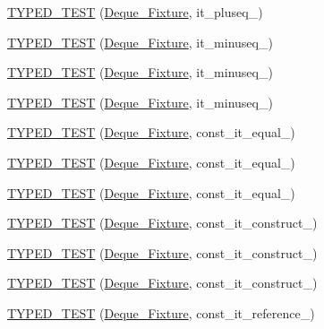 \begin{DoxyCompactItemize}
\item 
\hyperlink{TestDeque_8c_09_09_a83348782a2d697e92516c1c5467a10d7}{T\-Y\-P\-E\-D\-\_\-\-T\-E\-S\-T} (\hyperlink{structDeque__Fixture}{Deque\-\_\-\-Fixture}, it\-\_\-pluseq\-\_)
\item 
\hyperlink{TestDeque_8c_09_09_af4293d9b02bd65a8ecb50250392df485}{T\-Y\-P\-E\-D\-\_\-\-T\-E\-S\-T} (\hyperlink{structDeque__Fixture}{Deque\-\_\-\-Fixture}, it\-\_\-minuseq\-\_)
\item 
\hyperlink{TestDeque_8c_09_09_aec3532a1ac016c0df4398dea8561264b}{T\-Y\-P\-E\-D\-\_\-\-T\-E\-S\-T} (\hyperlink{structDeque__Fixture}{Deque\-\_\-\-Fixture}, it\-\_\-minuseq\-\_)
\item 
\hyperlink{TestDeque_8c_09_09_a49a17a0068e0b455588e67bb636487fc}{T\-Y\-P\-E\-D\-\_\-\-T\-E\-S\-T} (\hyperlink{structDeque__Fixture}{Deque\-\_\-\-Fixture}, it\-\_\-minuseq\-\_)
\item 
\hyperlink{TestDeque_8c_09_09_a64369599d2e9c44a1344c01d7560a035}{T\-Y\-P\-E\-D\-\_\-\-T\-E\-S\-T} (\hyperlink{structDeque__Fixture}{Deque\-\_\-\-Fixture}, const\-\_\-it\-\_\-equal\-\_)
\item 
\hyperlink{TestDeque_8c_09_09_a5b7c8323db2bcdb80015094cef40fc39}{T\-Y\-P\-E\-D\-\_\-\-T\-E\-S\-T} (\hyperlink{structDeque__Fixture}{Deque\-\_\-\-Fixture}, const\-\_\-it\-\_\-equal\-\_)
\item 
\hyperlink{TestDeque_8c_09_09_aa3fa6e247b0c583e0b61fa00ac7383eb}{T\-Y\-P\-E\-D\-\_\-\-T\-E\-S\-T} (\hyperlink{structDeque__Fixture}{Deque\-\_\-\-Fixture}, const\-\_\-it\-\_\-equal\-\_)
\item 
\hyperlink{TestDeque_8c_09_09_a1e5e7cef11974bc9d5a2be7049077692}{T\-Y\-P\-E\-D\-\_\-\-T\-E\-S\-T} (\hyperlink{structDeque__Fixture}{Deque\-\_\-\-Fixture}, const\-\_\-it\-\_\-construct\-\_)
\item 
\hyperlink{TestDeque_8c_09_09_a95265dc0120dd930ee0b1029c60a09cd}{T\-Y\-P\-E\-D\-\_\-\-T\-E\-S\-T} (\hyperlink{structDeque__Fixture}{Deque\-\_\-\-Fixture}, const\-\_\-it\-\_\-construct\-\_)
\item 
\hyperlink{TestDeque_8c_09_09_ab9253ff4f552f30054de74f5e4d5ac10}{T\-Y\-P\-E\-D\-\_\-\-T\-E\-S\-T} (\hyperlink{structDeque__Fixture}{Deque\-\_\-\-Fixture}, const\-\_\-it\-\_\-construct\-\_)
\item 
\hyperlink{TestDeque_8c_09_09_a78c1039782e5fd64468519f3f486462a}{T\-Y\-P\-E\-D\-\_\-\-T\-E\-S\-T} (\hyperlink{structDeque__Fixture}{Deque\-\_\-\-Fixture}, const\-\_\-it\-\_\-reference\-\_)
\item 

\end{DoxyCompactItemize}
